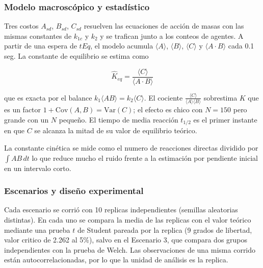 \documentclass{article}
\begin{document}
\subsubsection{Modelo macroscópico y estadístico}
Tres costos $A_{sd}$, $B_{sd}$, $C_{sd}$ resuelven las ecuaciones de acción de masas con las mismas constantes de $k_{1c}$ y $k_2$ y se trafican junto a los conteos de agentes.
A partir de una espera de $tEq$, el modelo acumula $\langle A \rangle$, $\langle B \rangle$, $\langle C \rangle$ y $\langle A\cdot B \rangle$ cada 0.1 seg. La constante de equilibrio se estima como

$$\hat{K}_{eq}=\frac{\langle C\rangle}{\langle A \cdot B\rangle}$$

que es exacta por el balance $k_1 \langle AB\rangle=k_2\langle C\rangle$. El cociente $\frac{\langle C\rangle}{\langle A\rangle \langle B\rangle}$ sobrestima $K$ que es un factor $1+\mathrm{Cov}(A,B)=\mathrm{Var}(C)$; el efecto es chico con $N=150$ pero grande con un $N$ pequeño. El tiempo de media reacción $t_{1/2}$ es el primer instante en que $C$ se alcanza la mitad de su valor de equilibrio teórico.

La constante cinética se mide como el numero de reacciones directas dividido por $\int{AB} \,dt$ lo que reduce mucho el ruido frente a la estimación por pendiente inicial en un intervalo corto.

\subsubsection{Escenarios y diseño experimental}
Cada escenario se corrió con 10 replicas independientes (semillas aleatorias distintas). En cada uno se compara la media de las replicas con el valor teórico mediante una prueba $t$ de Student pareada por la replica (9 grados de libertad, valor critico de 2.262 al 5\%), salvo en el Escenario 3, que compara dos grupos independientes con la prueba de Welch. Las observaciones de una misma corrido están autocorrelacionadas, por lo que la unidad de análisis es la replica.
\end{document}

